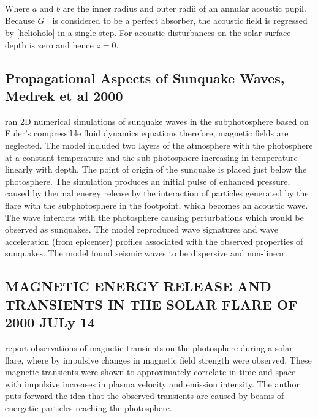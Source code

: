 Where $a$ and $b$ are the inner radius and outer radii of an annular acoustic pupil. Because $G_{+}$ is considered to be a perfect absorber, the acoustic field is regressed by \ref{helioholo} in a single step. For acoustic disturbances on the solar surface depth is zero and hence $z=0$.

\subsection{Propagational Aspects of Sunquake Waves, Medrek et al 2000}
\cite{2000AcA....50..405M} ran 2D numerical simulations of sunquake waves in the subphotosphere based on Euler's compressible fluid dynamics equations therefore, magnetic fields are neglected. The model included two layers of the atmosphere with the photosphere at a constant temperature and the sub-photosphere increasing in temperature linearly with depth. The point of origin of the sunquake is placed just below the photosphere. The simulation produces an initial pulse of enhanced pressure, caused by thermal energy release by the interaction of particles generated by the flare with the subphotosphere in the footpoint, which becomes an acoustic wave. The wave interacts with the photosphere causing perturbations which would be observed as sunquakes. The model reproduced wave signatures and wave acceleration (from epicenter) profiles associated with the observed properties of sunquakes. The model found seismic waves to be dispersive and non-linear.


\subsection{MAGNETIC ENERGY RELEASE AND TRANSIENTS IN THE SOLAR FLARE OF 2000 JULy 14}
\cite{2001ApJ...550L.105K} report observations of magnetic transients on the photosphere during a solar flare, where by impulsive changes in magnetic field strength were observed. These magnetic transients were shown to approximately correlate in time and space with impulsive increases in plasma velocity and emission intensity. The author puts forward the idea that the observed transients are caused by beams of energetic particles reaching the photosphere.   

